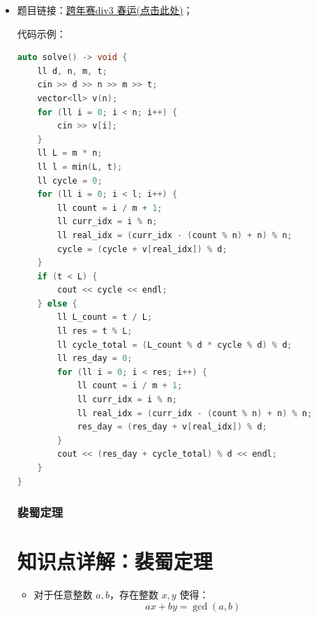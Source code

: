 \begin{itemize}
\textbf{通用防错公式：}
\[ \text{index} = (a - b \pmod n + n) \pmod n \]

\textbf{变量含义解析：}
\begin{itemize}
	\item \textbf{$a$ (基准逻辑索引)：} 目标对象在逻辑序列中的当前位置（通常是题目要求的第 $i$ 项）。
	\item \textbf{$b$ (动态偏移量)：} 整个坐标系相对于物理数组起始点的位移。如果系统向右转动了 $k$ 格，则偏移量通常关联这个转动数值。
	\item \textbf{$n$ (数组总长度)：} 循环队列或轨道的总格子数，即取模的基数（Modulus）。
\end{itemize}

\textbf{逻辑拆解：}
公式中的 \texttt{+ n} 是为了解决 $a < (b \pmod n)$ 时出现的负数情况。这相当于在数轴上向正方向预拨了一整圈，确保分子部分始终为正数，从而让 \texttt{\%} 运算符输出符合预期的物理下标 $[0, n-1]$。

\item 题目链接：\href{https://www.luogu.com.cn/problem/P15359?contestId=300994}{跨年赛div3 春运(点击此处)}；

代码示例：\\
\begin{lstlisting}[language=C++]
auto solve() -> void {
	ll d, n, m, t;
	cin >> d >> n >> m >> t;
	vector<ll> v(n);
	for (ll i = 0; i < n; i++) {
		cin >> v[i];
	}
	ll L = m * n;
	ll l = min(L, t);
	ll cycle = 0;
	for (ll i = 0; i < l; i++) {
		ll count = i / m + 1;
		ll curr_idx = i % n;
		ll real_idx = (curr_idx - (count % n) + n) % n;
		cycle = (cycle + v[real_idx]) % d;
	}
	if (t < L) {
		cout << cycle << endl;
	} else {
		ll L_count = t / L;
		ll res = t % L;
		ll cycle_total = (L_count % d * cycle % d) % d;
		ll res_day = 0;
		for (ll i = 0; i < res; i++) {
			ll count = i / m + 1;
			ll curr_idx = i % n;
			ll real_idx = (curr_idx - (count % n) + n) % n;
			res_day = (res_day + v[real_idx]) % d;
		}
		cout << (res_day + cycle_total) % d << endl;
	}
}
\end{lstlisting}
\subsubsection{裴蜀定理}
\section*{知识点详解：裴蜀定理}
\begin{itemize}
\item %
对于任意整数 $a, b$，存在整数 $x, y$ 使得：
\[ ax + by = \gcd(a, b) \]


\end{itemize}
\end{itemize}

